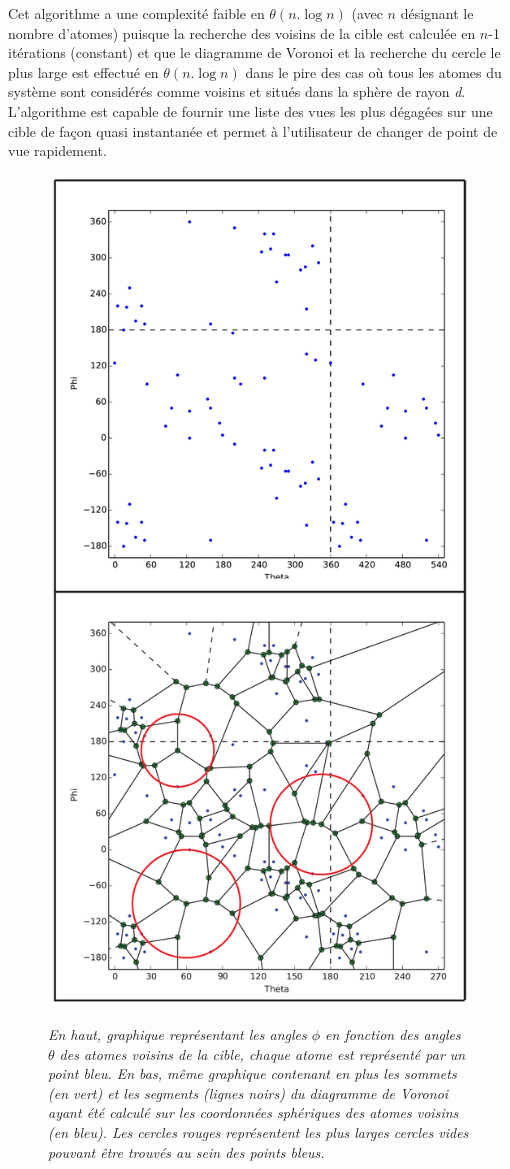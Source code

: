 Cet algorithme a une complexité faible en $\theta(n.\log{n})$ (avec $n$ désignant le nombre d'atomes) puisque la recherche des voisins de la cible est calculée en $n$-1 itérations (constant) et que le diagramme de Voronoi et la recherche du cercle le plus large est effectué en $\theta(n.\log{n})$ dans le pire des cas où tous les atomes du système sont considérés comme voisins et situés dans la sphère de rayon \textit{d}. L'algorithme est capable de fournir une liste des vues les plus dégagées sur une cible de façon quasi instantanée et permet à l'utilisateur de changer de point de vue rapidement.

\begin{figure}[h]
  \centering
  {\includegraphics[width=.5\linewidth]{./figures/ch3/voronoi_diagram}}
    \caption[Graphique représentant les angles $\phi$ en fonction des angles $\theta$ des atomes voisins de la cible.]{{\it En haut, graphique représentant les angles $\phi$ en fonction des angles $\theta$ des atomes voisins de la cible, chaque atome est représenté par un point bleu. En bas, même graphique contenant en plus les sommets (en vert) et les segments (lignes noirs) du diagramme de Voronoi ayant été calculé sur les coordonnées sphériques des atomes voisins (en bleu). Les cercles rouges représentent les plus larges cercles vides pouvant être trouvés au sein des points bleus.}}
  \label{Fig:voronoi_diagram}
  \hspace{0.2cm}
\end{figure}

